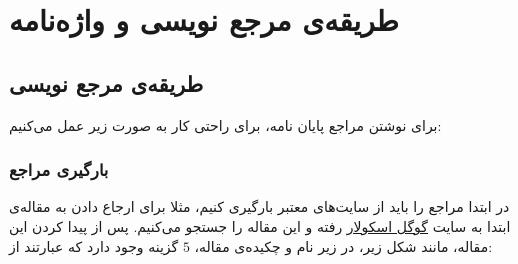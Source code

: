 \chapter{طریقه‌ی مرجع نویسی و واژه‌نامه‌}
\section{طریقه‌ی مرجع نویسی}
برای نوشتن مراجع پایان نامه، برای راحتی کار به صورت زیر عمل می‌کنیم:
\subsection{بارگیری مراجع}
در ابتدا مراجع را باید از سایت‌های معتبر بارگیری کنیم، مثلا برای ارجاع دادن به مقاله‌ی
ابتدا به سایت
\href{scholar.google.com}{گوگل اسکولار} 
رفته و این مقاله را جستجو می‌کنیم. پس از پیدا کردن این مقاله، مانند شکل زیر، در زیر نام و چکیده‌ی مقاله، $5$ گزینه وجود دارد که عبارتند از:\\

